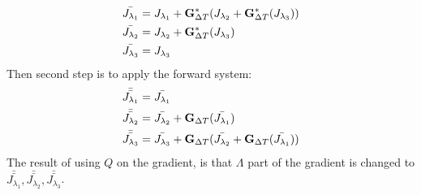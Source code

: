 \documentclass[11pt,a4paper]{article}
\begin{document}
\begin{align*}
\bar{J_{\lambda_1}} &=J_{\lambda_1} +\bold{G}_{\Delta T}^*(J_{\lambda_2} + \bold{G}_{\Delta T}^*(J_{\lambda_3}))\\
\bar{J_{\lambda_2}} &=J_{\lambda_2} + \bold{G}_{\Delta T}^*(J_{\lambda_3})\\
\bar{J_{\lambda_3}} &=J_{\lambda_3} 
\end{align*} 
Then second step is to apply the forward system:
\begin{align*}
\bar{\bar{J_{\lambda_1}}}&=\bar{J_{\lambda_1}} \\
\bar{\bar{J_{\lambda_2}}}&=\bar{J_{\lambda_2}}+ \bold{G}_{\Delta T}(\bar{J_{\lambda_1}}) \\
\bar{\bar{J_{\lambda_3}}}&=\bar{J_{\lambda_3}} + \bold{G}_{\Delta T}(\bar{J_{\lambda_2}}+ \bold{G}_{\Delta T}(\bar{J_{\lambda_1}}))
\end{align*} 
The result of using $Q$ on the gradient, is that $\Lambda$ part of the gradient is changed to $\bar{\bar{J_{\lambda_1}}}, \bar{\bar{J_{\lambda_2}}},\bar{\bar{J_{\lambda_3}}}$.  
\end{document}
